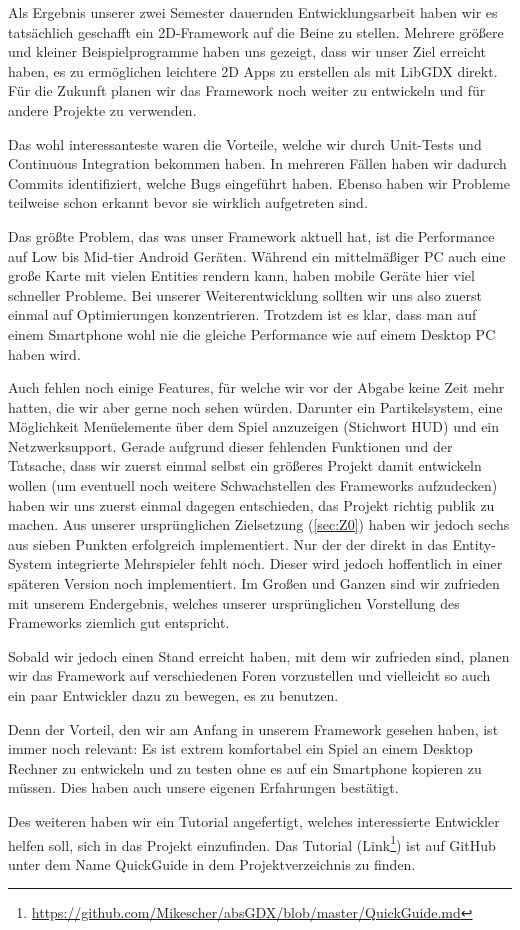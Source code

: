 Als Ergebnis unserer zwei Semester dauernden Entwicklungsarbeit haben wir es tatsächlich geschafft ein 2D-Framework auf die Beine zu stellen.
Mehrere größere und kleiner Beispielprogramme haben uns gezeigt, dass wir unser Ziel erreicht haben, es zu ermöglichen leichtere 2D Apps zu erstellen als mit LibGDX direkt.
Für die Zukunft planen wir das Framework noch weiter zu entwickeln und für andere Projekte zu verwenden.

Das wohl interessanteste waren die Vorteile, welche wir durch Unit-Tests und Continuous Integration bekommen haben. In mehreren Fällen haben wir dadurch Commits identifiziert, welche Bugs eingeführt haben. Ebenso haben wir Probleme teilweise schon erkannt bevor sie wirklich aufgetreten sind.

Das größte Problem, das was unser Framework aktuell hat, ist die Performance auf Low bis Mid-tier Android Geräten. Während ein mittelmäßiger PC auch eine große Karte mit vielen Entities rendern kann, haben mobile Geräte hier viel schneller Probleme. Bei unserer Weiterentwicklung sollten wir uns also zuerst einmal auf Optimierungen konzentrieren. Trotzdem ist es klar, dass man auf einem Smartphone wohl nie die gleiche Performance wie auf einem Desktop PC haben wird.

Auch fehlen noch einige Features, für welche wir vor der Abgabe keine Zeit mehr hatten, die wir aber gerne noch sehen würden. Darunter ein Partikelsystem, eine Möglichkeit Menüelemente über dem Spiel anzuzeigen (Stichwort HUD) und ein Netzwerksupport. Gerade aufgrund dieser fehlenden Funktionen und der Tatsache, dass wir zuerst einmal selbst ein größeres Projekt damit entwickeln wollen (um eventuell noch weitere Schwachstellen des Frameworks aufzudecken) haben wir uns zuerst einmal dagegen entschieden, das Projekt richtig publik zu machen. 
Aus unserer ursprünglichen Zielsetzung (\ref{sec:Z0}) haben wir jedoch sechs aus sieben Punkten erfolgreich implementiert. Nur der der direkt in das Entity-System integrierte Mehrspieler fehlt noch. Dieser wird jedoch hoffentlich in einer späteren Version noch implementiert. Im Großen und Ganzen sind wir zufrieden mit unserem Endergebnis, welches unserer ursprünglichen Vorstellung des Frameworks ziemlich gut entspricht.

Sobald wir jedoch einen Stand erreicht haben, mit dem wir zufrieden sind, planen wir das Framework auf verschiedenen Foren vorzustellen und vielleicht so auch ein paar Entwickler dazu zu bewegen, es zu benutzen.

Denn der Vorteil, den wir am Anfang in unserem Framework gesehen haben, ist immer noch relevant: Es ist extrem komfortabel ein Spiel an einem Desktop Rechner zu entwickeln und zu testen ohne es auf ein Smartphone kopieren zu müssen. Dies haben auch unsere eigenen Erfahrungen bestätigt. 

Des weiteren haben wir ein Tutorial angefertigt, welches interessierte Entwickler helfen soll, sich in das Projekt einzufinden. Das Tutorial (Link\footnote{\url{https://github.com/Mikescher/absGDX/blob/master/QuickGuide.md}}) ist auf GitHub unter dem Name QuickGuide in dem Projektverzeichnis zu finden. 
